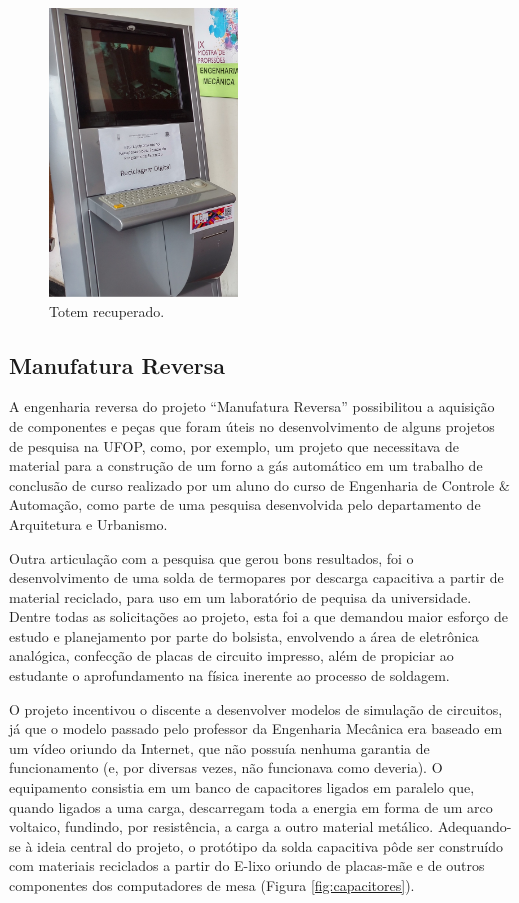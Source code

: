 \documentclass[a4paper]{ifacconf}
\begin{document}
\begin{figure}
	\centering
	\includegraphics[width=5cm]{figuras/totem.jpg}
	\caption{Totem recuperado.}  \label{fig:totem} 
\end{figure}

\subsection{Manufatura Reversa}
A engenharia reversa do projeto ``Manufatura Reversa'' possibilitou a aquisição de componentes e peças
que foram úteis no desenvolvimento de alguns projetos de pesquisa na UFOP, como, por exemplo, um projeto que necessitava de material para a construção de um forno a gás automático em um  trabalho de conclusão de curso realizado por um aluno do curso de Engenharia de Controle $\&$ Automação, como parte de uma pesquisa desenvolvida pelo departamento de Arquitetura e Urbanismo.

Outra articulação com a pesquisa que gerou bons resultados, foi o desenvolvimento de uma solda de termopares por descarga capacitiva a partir de material reciclado, para uso em um laboratório de pequisa da universidade. Dentre todas as solicitações ao projeto, esta foi a que demandou maior esforço de estudo e planejamento por parte do bolsista, envolvendo a área de eletrônica analógica, confecção de placas de circuito impresso, além de propiciar ao estudante o aprofundamento na física inerente ao processo de soldagem.

O projeto incentivou o discente a desenvolver modelos de simulação de circuitos, já que o modelo passado pelo professor da Engenharia Mecânica era baseado em um vídeo oriundo da Internet, que não possuía nenhuma garantia de funcionamento (e, por diversas vezes, não funcionava como deveria). O equipamento consistia em um banco de capacitores ligados em paralelo que, quando ligados a uma carga, descarregam toda a energia em forma de um arco voltaico, fundindo, por resistência, a carga a outro material metálico.  
Adequando-se à ideia central do projeto, o protótipo da solda capacitiva pôde ser construído com materiais reciclados a partir do E-lixo oriundo de placas-mãe e de outros componentes dos computadores de mesa (Figura \ref{fig:capacitores}).
\end{document}
